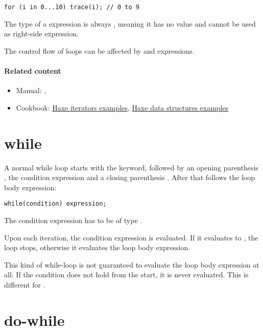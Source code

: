 \begin{lstlisting}
for (i in 0...10) trace(i); // 0 to 9
\end{lstlisting}

The type of a  expression is always , meaning it has no value and cannot be used as right-side expression.

The control flow of loops can be affected by  and  expressions.

\paragraph{Related content}
\begin{itemize}
	\item Manual: , 
	\item Cookbook: \href{http://code.haxe.org/tag/iterator.html}{Haxe iterators examples}, \href{http://code.haxe.org/tag/data-structures.html}{Haxe data structures examples}
\end{itemize}

\section{while}
\label{expression-while}

A normal while loop starts with the  keyword, followed by an opening parenthesis \expr{(}, the condition expression and a closing parenthesis \expr{)}. After that follows the loop body expression:

\begin{lstlisting}
while(condition) expression;
\end{lstlisting}

The condition expression has to be of type .

Upon each iteration, the condition expression is evaluated. If it evaluates to , the loop stops, otherwise it evaluates the loop body expression.


This kind of while-loop is not guaranteed to evaluate the loop body expression at all: If the condition does not hold from the start, it is never evaluated. This is different for .

\section{do-while}
\label{expression-do-while}

